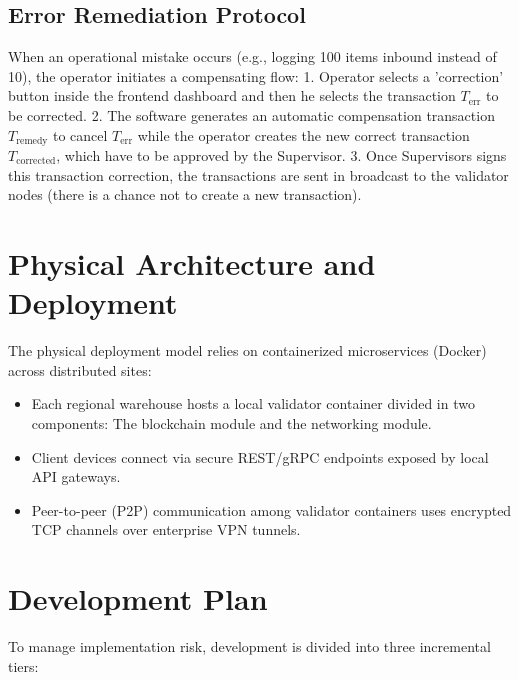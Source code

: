 \documentclass[11pt,a4paper]{memoir}
\begin{document}
\subsection{Error Remediation Protocol}
When an operational mistake occurs (e.g., logging 100 items inbound instead of 10), the operator initiates a compensating flow:
1. Operator selects a 'correction' button inside the frontend dashboard and then he selects the transaction $T_{\text{err}}$ to be corrected.
2. The software generates an automatic compensation transaction $T_{\text{remedy}}$ to cancel $T_{\text{err}}$ while the operator creates the new correct transaction $T_{\text{corrected}}$, which have to be approved by the Supervisor.
3. Once Supervisors signs this transaction correction, the transactions are sent in broadcast to the validator nodes (there is a chance not to create a new transaction).

\section{Physical Architecture and Deployment}
The physical deployment model relies on containerized microservices (Docker) across distributed sites:
\begin{itemize}
    \item Each regional warehouse hosts a local validator container divided in two components: The blockchain module and the networking module. 
    \item Client devices connect via secure REST/gRPC endpoints exposed by local API gateways.
    \item Peer-to-peer (P2P) communication among validator containers uses encrypted TCP channels over enterprise VPN tunnels.
\end{itemize}

\section{Development Plan}
To manage implementation risk, development is divided into three incremental tiers:
\end{document}

